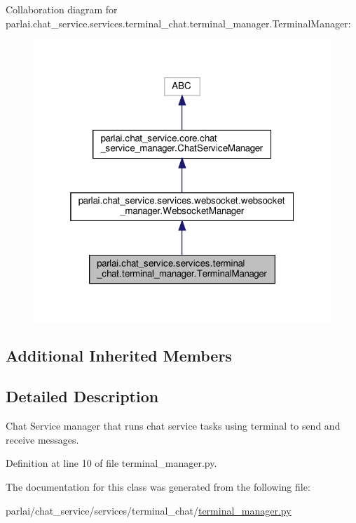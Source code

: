 Collaboration diagram for parlai.\+chat\+\_\+service.\+services.\+terminal\+\_\+chat.\+terminal\+\_\+manager.\+Terminal\+Manager\+:\nopagebreak
\begin{figure}[H]
\begin{center}
\leavevmode
\includegraphics[width=319pt]{dd/d78/classparlai_1_1chat__service_1_1services_1_1terminal__chat_1_1terminal__manager_1_1TerminalManager__coll__graph}
\end{center}
\end{figure}
\subsection*{Additional Inherited Members}


\subsection{Detailed Description}
\begin{DoxyVerb}Chat Service manager that runs chat service tasks using terminal to send and receive
messages.
\end{DoxyVerb}
 

Definition at line 10 of file terminal\+\_\+manager.\+py.



The documentation for this class was generated from the following file\+:\begin{DoxyCompactItemize}
\item 
parlai/chat\+\_\+service/services/terminal\+\_\+chat/\hyperlink{terminal__manager_8py}{terminal\+\_\+manager.\+py}\end{DoxyCompactItemize}
